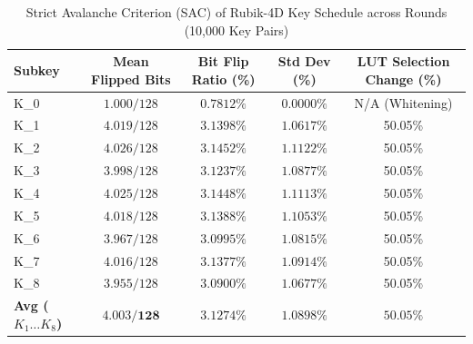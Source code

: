 
\begin{table}[htbp]
\caption{Strict Avalanche Criterion (SAC) of Rubik-4D Key Schedule across Rounds (10,000 Key Pairs)}
\label{tab:key_schedule_sac}
\centering
\small
\begin{tabular}{@{}lcccc@{}}
\toprule
\textbf{Subkey} & \textbf{Mean Flipped Bits} & \textbf{Bit Flip Ratio (\%)} & \textbf{Std Dev (\%)} & \textbf{LUT Selection Change (\%)} \\ \midrule
K_0 & $1.000 / 128$ & $0.7812\%$ & $0.0000\%$ & N/A (Whitening) \\
K_1 & $4.019 / 128$ & $3.1398\%$ & $1.0617\%$ & 50.05\% \\
K_2 & $4.026 / 128$ & $3.1452\%$ & $1.1122\%$ & 50.05\% \\
K_3 & $3.998 / 128$ & $3.1237\%$ & $1.0877\%$ & 50.05\% \\
K_4 & $4.025 / 128$ & $3.1448\%$ & $1.1113\%$ & 50.05\% \\
K_5 & $4.018 / 128$ & $3.1388\%$ & $1.1053\%$ & 50.05\% \\
K_6 & $3.967 / 128$ & $3.0995\%$ & $1.0815\%$ & 50.05\% \\
K_7 & $4.016 / 128$ & $3.1377\%$ & $1.0914\%$ & 50.05\% \\
K_8 & $3.955 / 128$ & $3.0900\%$ & $1.0677\%$ & 50.05\% \\
\midrule
\textbf{Avg ($K_1 \dots K_8$)} & $\mathbf{4.003 / 128}$ & $\mathbf{3.1274\%}$ & $\mathbf{1.0898\%}$ & $\mathbf{50.05\%}$ \\
\bottomrule
\end{tabular}
\end{table}

